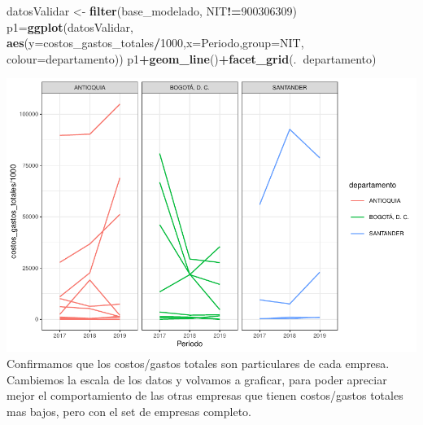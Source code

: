 \documentclass[
  11pt,
  a4paper,
]{book}
\newenvironment{Shaded}{\begin{snugshade}}{\end{snugshade}}
\newcommand{\DataTypeTok}[1]{\textcolor[rgb]{0.13,0.29,0.53}{#1}}
\newcommand{\DecValTok}[1]{\textcolor[rgb]{0.00,0.00,0.81}{#1}}
\newcommand{\KeywordTok}[1]{\textcolor[rgb]{0.13,0.29,0.53}{\textbf{#1}}}
\newcommand{\NormalTok}[1]{#1}
\newcommand{\OperatorTok}[1]{\textcolor[rgb]{0.81,0.36,0.00}{\textbf{#1}}}
\newcommand{\StringTok}[1]{\textcolor[rgb]{0.31,0.60,0.02}{#1}}
\begin{document}
\begin{Shaded}
\begin{Highlighting}[]
\NormalTok{datosValidar <-}\StringTok{ }\KeywordTok{filter}\NormalTok{(base_modelado, NIT}\OperatorTok{!=}\DecValTok{900306309}\NormalTok{)}
\NormalTok{p1=}\KeywordTok{ggplot}\NormalTok{(datosValidar, }\KeywordTok{aes}\NormalTok{(}\DataTypeTok{y=}\NormalTok{costos_gastos_totales}\OperatorTok{/}\DecValTok{1000}\NormalTok{,}\DataTypeTok{x=}\NormalTok{Periodo,}\DataTypeTok{group=}\NormalTok{NIT,}
                            \DataTypeTok{colour=}\NormalTok{departamento))}
\NormalTok{p1}\OperatorTok{+}\KeywordTok{geom_line}\NormalTok{()}\OperatorTok{+}\KeywordTok{facet_grid}\NormalTok{(.}\OperatorTok{~}\NormalTok{departamento)}
\end{Highlighting}
\end{Shaded}

\includegraphics{index_files/figure-latex/unnamed-chunk-53-1.pdf}
Confirmamos que los costos/gastos totales son particulares de cada
empresa. Cambiemos la escala de los datos y volvamos a graficar, para
poder apreciar mejor el comportamiento de las otras empresas que tienen
costos/gastos totales mas bajos, pero con el set de empresas completo.
\end{document}

